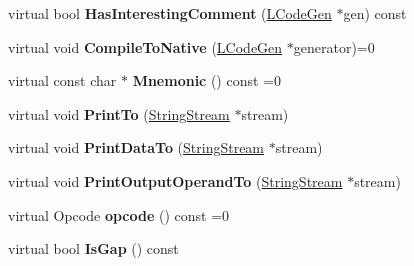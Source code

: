 \begin{DoxyCompactItemize}
\item 
virtual bool {\bfseries Has\+Interesting\+Comment} (\hyperlink{classv8_1_1internal_1_1_l_code_gen}{L\+Code\+Gen} $\ast$gen) const \hypertarget{classv8_1_1internal_1_1_l_instruction_affae35afdf10150a226c035d47b8ce27}{}\label{classv8_1_1internal_1_1_l_instruction_affae35afdf10150a226c035d47b8ce27}

\item 
virtual void {\bfseries Compile\+To\+Native} (\hyperlink{classv8_1_1internal_1_1_l_code_gen}{L\+Code\+Gen} $\ast$generator)=0\hypertarget{classv8_1_1internal_1_1_l_instruction_acab3d83fd0de1d783ce5e5e8651009dd}{}\label{classv8_1_1internal_1_1_l_instruction_acab3d83fd0de1d783ce5e5e8651009dd}

\item 
virtual const char $\ast$ {\bfseries Mnemonic} () const  =0\hypertarget{classv8_1_1internal_1_1_l_instruction_ae256d0dcc2d6017d8c49d382254dccee}{}\label{classv8_1_1internal_1_1_l_instruction_ae256d0dcc2d6017d8c49d382254dccee}

\item 
virtual void {\bfseries Print\+To} (\hyperlink{classv8_1_1internal_1_1_string_stream}{String\+Stream} $\ast$stream)\hypertarget{classv8_1_1internal_1_1_l_instruction_a7fd3ca39e41f221d7dd97c947219770c}{}\label{classv8_1_1internal_1_1_l_instruction_a7fd3ca39e41f221d7dd97c947219770c}

\item 
virtual void {\bfseries Print\+Data\+To} (\hyperlink{classv8_1_1internal_1_1_string_stream}{String\+Stream} $\ast$stream)\hypertarget{classv8_1_1internal_1_1_l_instruction_a3e3375f04ff4ab46cd75200cfa1b918d}{}\label{classv8_1_1internal_1_1_l_instruction_a3e3375f04ff4ab46cd75200cfa1b918d}

\item 
virtual void {\bfseries Print\+Output\+Operand\+To} (\hyperlink{classv8_1_1internal_1_1_string_stream}{String\+Stream} $\ast$stream)\hypertarget{classv8_1_1internal_1_1_l_instruction_af5f97137ae7c1b7af3737b41c235f28f}{}\label{classv8_1_1internal_1_1_l_instruction_af5f97137ae7c1b7af3737b41c235f28f}

\item 
virtual Opcode {\bfseries opcode} () const  =0\hypertarget{classv8_1_1internal_1_1_l_instruction_aa0129e8a782b2dd3d9753986e3d245f1}{}\label{classv8_1_1internal_1_1_l_instruction_aa0129e8a782b2dd3d9753986e3d245f1}

\item 
virtual bool {\bfseries Is\+Gap} () const \hypertarget{classv8_1_1internal_1_1_l_instruction_a96115165585397545ac4945072c27dfc}{}\label{classv8_1_1internal_1_1_l_instruction_a96115165585397545ac4945072c27dfc}


\end{DoxyCompactItemize}
